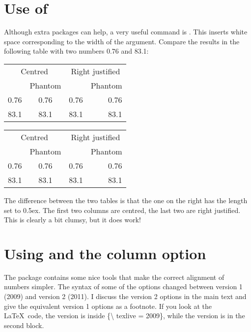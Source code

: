 \section{Use of }
\label{sec:table:phantom}

Although extra packages can help, a very useful command is
. This inserts white space corresponding to the width
of the argument. Compare the results in the following table with two
numbers 0.76 and 83.1:

\begin{tabular}{cc|rr}
  \multicolumn{2}{c|}{Centred} &
  \multicolumn{2}{c}{Right justified} \\
  & Phantom & & Phantom\\\hline
  0.76 & \phantom{0}0.76 & 0.76 & 0.76\\
  83.1 & 83.1\phantom{0} & 83.1 & 83.1\phantom{0}
\end{tabular}
\qquad
{\setlength{\extrarowheight}{0.5ex}
\begin{tabular}{cc|rr}
  \multicolumn{2}{c|}{Centred} &
  \multicolumn{2}{c}{Right justified} \\
  & Phantom & & Phantom\\\hline
  0.76 & \phantom{0}0.76 & 0.76 & 0.76\\
  83.1 & 83.1\phantom{0} & 83.1 & 83.1\phantom{0}
\end{tabular}
}
\par\noindent
The difference between the two tables is that the one on the right
has the length  set to 0.5ex.  The first two
columns are centred, the last two are right justified.  This is
clearly a bit clumsy, but it does work!


\section{Using  and the  column option}
\label{sec:table:siunitx}

The  package contains some nice tools that make the
correct alignment of numbers simpler. The syntax of some of the
options changed between version 1 (2009) and version 2 (2011). I
discuss the version 2 options in the main text and give the equivalent
version 1 options as a footnote. If you look at the \LaTeX\ code, the
 version is inside \{\textbackslash
texlive = 2009\}, while the  version is in the second
block.

